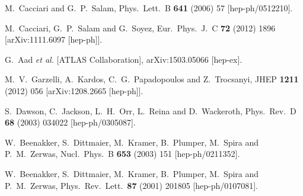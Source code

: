 \documentclass[preprintnumbers,superscriptaddress,nofootinbib,aps,prd,floatfix]{revtex4}
\begin{document}
\begin{thebibliography}{99}
  M.~Cacciari and G.~P.~Salam,
  Phys.\ Lett.\ B {\bf 641} (2006) 57
  [hep-ph/0512210].
  
  M.~Cacciari, G.~P.~Salam and G.~Soyez,
  Eur.\ Phys.\ J.\ C {\bf 72} (2012) 1896
  [arXiv:1111.6097 [hep-ph]].
       
  G.~Aad {\it et al.} [ATLAS Collaboration],
  arXiv:1503.05066 [hep-ex].

  M.~V.~Garzelli, A.~Kardos, C.~G.~Papadopoulos and Z.~Trocsanyi,
  JHEP {\bf 1211} (2012) 056
  [arXiv:1208.2665 [hep-ph]].
  
  S.~Dawson, C.~Jackson, L.~H.~Orr, L.~Reina and D.~Wackeroth,
  Phys.\ Rev.\ D {\bf 68} (2003) 034022
  [hep-ph/0305087].
  
  W.~Beenakker, S.~Dittmaier, M.~Kramer, B.~Plumper, M.~Spira and P.~M.~Zerwas,
  Nucl.\ Phys.\ B {\bf 653} (2003) 151
  [hep-ph/0211352].
  
  W.~Beenakker, S.~Dittmaier, M.~Kramer, B.~Plumper, M.~Spira and P.~M.~Zerwas,
  Phys.\ Rev.\ Lett.\  {\bf 87} (2001) 201805
  [hep-ph/0107081].
  

\end{thebibliography}
\end{document}
